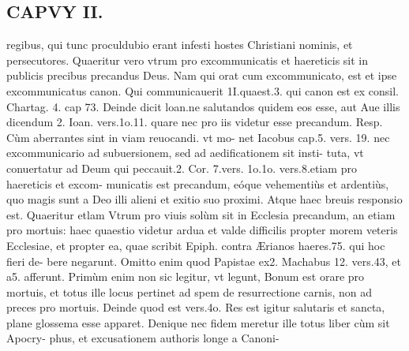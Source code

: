 \documentclass{article}
\begin{document}
\begin{pages}
\section*{CAPVY II. }
\marginpar{[ p.45 ]}\pstart regibus, qui tunc proculdubio erant infesti hostes Christiani nominis, et persecutores.  \pend\pstart Quaeritur vero vtrum pro excommunicatis et haereticis sit in publicis precibus precandus Deus. Nam qui orat cum excommunicato, est et ipse excommunicatus canon. Qui communicauerit 1I.quaest.3. qui canon est ex consil. Chartag. 4. cap 73. Deinde dicit loan.ne salutandos quidem eos esse, aut Aue illis dicendum 2. Ioan. vers.1o.11. quare nec pro iis videtur esse precandum. Resp. Cùm aberrantes sint in viam reuocandi. vt mo- net Iacobus cap.5. vers. 19. nec excommunicario ad subuersionem, sed ad aedificationem sit insti- tuta, vt conuertatur ad Deum qui peccauit.2. Cor. 7.vers. 1o.1o. vers.8.etiam pro haereticis et excom- municatis est precandum, eóque vehementiùs et ardentiùs, quo magis sunt a Deo illi alieni et exitio suo proximi. Atque haec breuis responsio est.  \pend\pstart Quaeritur etlam Vtrum pro viuis solùm sit in Ecclesia precandum, an etiam pro mortuis: haec quaestio videtur ardua et valde difficilis propter morem veteris Ecclesiae, et propter ea, quae scribit Epiph. contra Ærianos haeres.75. qui hoc fieri de- bere negarunt. Omitto enim quod Papistae ex2. Machabus  12. vers.43, et a5. afferunt. Primùm enim non sic legitur, vt legunt, Bonum est orare pro mortuis, et totus ille locus pertinet ad spem de resurrectione carnis, non ad preces pro mortuis. Deinde quod est vers.4o. Res est igitur salutaris et sancta, plane glossema esse apparet. Denique nec fidem meretur ille totus liber cùm sit Apocry- phus, et excusationem authoris longe a Canoni-  \pend

\end{pages}
\end{document}
